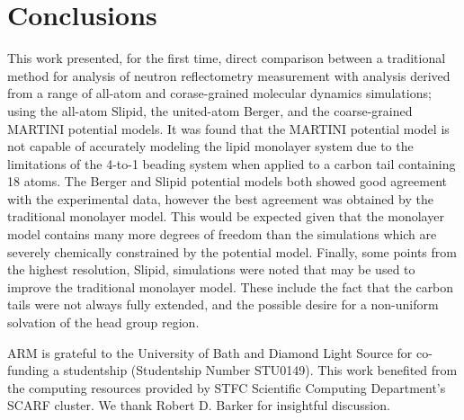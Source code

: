 \documentclass[amsmath,amssymb,twocolumn,superscriptaddress,aps,prl]{revtex4-1}
\begin{document}
\section{Conclusions}
This work presented, for the first time, direct comparison between a traditional method for analysis of neutron reflectometry measurement with analysis derived from a range of all-atom and corase-grained molecular dynamics simulations; using the all-atom Slipid, the united-atom Berger, and the coarse-grained MARTINI potential models.
It was found that the MARTINI potential model is not capable of accurately modeling the lipid monolayer system due to the limitations of the 4-to-1 beading system when applied to a carbon tail containing 18 atoms.
The Berger and Slipid potential models both showed good agreement with the experimental data, however the best agreement was obtained by the traditional monolayer model.
This would be expected given that the monolayer model contains many more degrees of freedom than the simulations which are severely chemically constrained by the potential model.
Finally, some points from the highest resolution, Slipid, simulations were noted that may be used to improve the traditional monolayer model.
These include the fact that the carbon tails were not always fully extended, and the possible desire for a non-uniform solvation of the head group region.

\begin{acknowledgements}
ARM is grateful to the University of Bath and Diamond Light Source for co-funding a studentship (Studentship Number STU0149). This work benefited from the computing resources provided by STFC Scientific Computing Department's SCARF cluster.
We thank Robert D. Barker for insightful discussion.
\end{acknowledgements}


\end{document}
